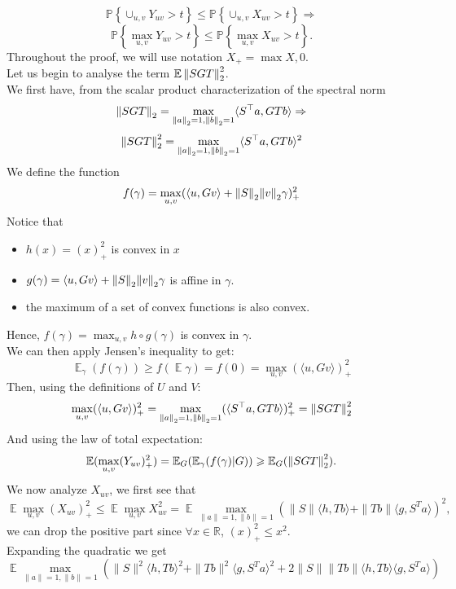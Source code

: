 \documentclass[12pt,letterpaper]{article}
\newcommand{\R}{\mathbb{R}}
\newcommand{\E}{\Expect}
\renewcommand{\le}{\leqslant}
\renewcommand{\ge}{\geqslant}
\newcommand{\snorm}[1]{\norm{#1}_2}
\newcommand{\snormsq}[1]{\snorm{#1}^2}
\newcommand{\Expect}{\operatorname{\mathbb{E}}}
\newcommand{\Prob}[1]{\mathbb{P}\left\{ #1 \right\}}
\begin{document}
\begin{enumerate}
$$
\Prob {\cup_{u,v}Y_{uv}>t} \leq \Prob  {\cup_{u,v}X_{uv}>t} \Rightarrow
$$
$$
\Prob {\max_{u,v}Y_{uv}>t} \leq \Prob  {\max_{u,v}X_{uv}>t} .
$$
Throughout the proof, we will use notation $X_+=\max{X,0}$.\\ 
Let us begin to analyse the term $\Expect{\snormsq{SGT}}$.\\
We first have, from the scalar product characterization of the spectral norm
$$
\snorm{SGT} = \max_{\snorm{a}=1,\snorm{b} = 1}\langle S^\top a,GTb\rangle
\Rightarrow
$$
$$
\snorm{SGT}^2 = \max_{\snorm{a}=1,\snorm{b} = 1}\langle S^\top a,GTb\rangle^2
$$
We define the function 
$$
f(\gamma) = \max_{u,v}(\langle u,Gv\rangle+ \snorm{S}\snorm{v}\gamma)^2_+
$$
Notice that 
\begin{itemize}
    \item $h(x) = (x)_+^2$ is convex in $x$
    \item $g(\gamma) = \langle u,Gv\rangle+ \snorm{S}\snorm{v}\gamma$ is affine in $\gamma$.
    \item the maximum of a set of convex functions is also convex.
\end{itemize}
Hence, $f(\gamma) = \max_{u,v}h\circ g(\gamma)$ is convex in $\gamma$.\\
We can then apply Jensen's inequality to get:
$$
\Expect_\gamma( f(\gamma)) \ge f(\Expect \gamma) = f(0) = \max_{u,v}(\langle u,Gv\rangle)^2_+
$$
Then, using the definitions of $U$ and $V$:
$$
\max_{u,v}(\langle u,Gv\rangle)^2_+
=
\max_{\snorm{a}=1,\snorm{b}=1}(\langle S^\top a,GTb\rangle)^2_+
=
\snormsq{SGT}
$$
And using the law of total expectation:
$$
\Expect(\max_{u,v}(Y_{uv})^2_+)= 
\Expect_G(\Expect_\gamma(f(\gamma)|G))
\ge \Expect_G(\snormsq{SGT}).
$$
We now analyze $X_{uv}$, we first see that  
$$
\E\max_{u,v} (X_{uv})_{+}^{2} \leq\E\max_{u,v}X_{uv}^{2} = \E\max_{\|a\|=1,\|b\| = 1}\left(\|S\|\langle h,Tb \rangle +\|Tb\|\langle g,S^{T}a\rangle\right)^{2},
$$
we can drop the positive part since $\forall x\in \R$, $(x)_+^2 \le x^2$.\\
Expanding the quadratic we get
\begin{equation}
    \label{bound1}
    \E\max_{\|a\|=1,\|b\| = 1}\left(\|S\|^2\langle h,Tb \rangle^2 +\|Tb\|^2\langle g,S^{T}a\rangle^2 +
2\|S\| \|Tb\| \langle h,Tb \rangle\langle g,S^{T}a\rangle
\right )
\end{equation}



\end{enumerate}
\end{document}
